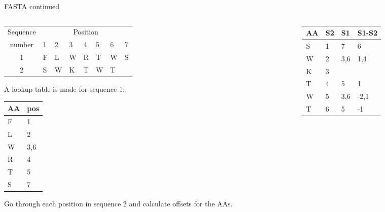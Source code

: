 \documentclass[pdf]{beamer}
\begin{document}
\begin{frame}[fragile]{FASTA continued}
  \begin{columns}
    \begin{column}[t]{0.5\textwidth}
      {\tiny
        \setlength{\tabcolsep}{0.5em}
      \begin{tabular}{c*{7}{l}}
        Sequence & \multicolumn{7}{c}{Position}\\
        number & 1 & 2 & 3 & 4 & 5 & 6 & 7\\
        1 & F & L & W & R & T & W & S\\
        2 & S & W & K & T & W & T & \\
      \end{tabular}
      }
      \vspace{2ex}

      \pause
      A lookup table is made for sequence 1:
      
      \vspace{2ex}
      {\tiny
        \setlength{\tabcolsep}{0.5em}
      \begin{tabular}{l|l}
        AA & pos \\
        \hline
        F & 1 \\
        L & 2 \\
        W & 3,6 \\
        R & 4 \\
        T & 5 \\
        S & 7 \\
      \end{tabular}
      }
      \pause

      \vspace{2ex}
      Go through each position in sequence 2 and calculate offsets for the AAs.
      \end{column}
    \begin{column}[t]{0.5\textwidth}
      {\tiny
        \setlength{\tabcolsep}{0.5em}
        \begin{tabular}{l|ll|l}
          AA & S2 & S1 & S1-S2 \\
          \hline
          S & 1 & 7 & 6\\
          W & 2 & 3,6 & 1,4\\
          K & 3 & & \\
          T & 4 & 5 & 1\\
          W & 5 & 3,6 & -2,1\\
          T & 6 & 5 & -1\\
        \end{tabular}
      }
      \pause


\end{column}
\end{columns}
\end{frame}
\end{document}
